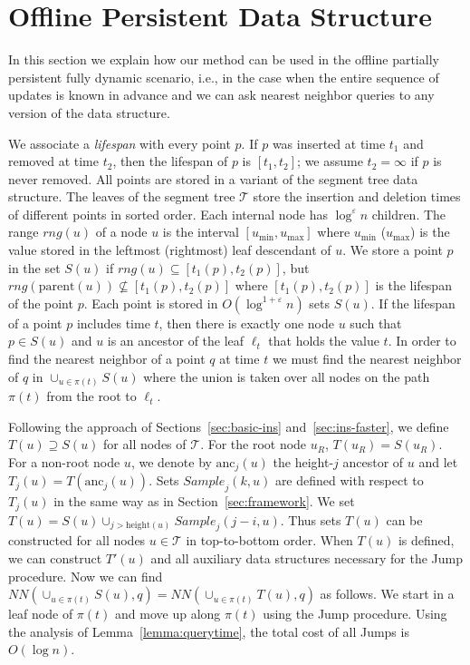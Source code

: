 \documentclass[10pt,a4paper]{amsart}
\newcommand{\Sample}{\mathit{Sample}}
\newcommand{\NN}{\mathit{NN}}
\newcommand{\mcT}{\mathcal{T}}
\newcommand{\eps}{\varepsilon}
\begin{document}
\section{Offline Persistent Data Structure}
\label{sec:persist}
In this section we explain how our method can be used in the offline partially persistent fully dynamic scenario, i.e., in the case when the entire sequence of updates is known in advance and we can ask nearest neighbor queries to any version of the data structure.

We associate a \emph{lifespan} with every point $p$. If $p$ was inserted at time $t_1$ and removed at time $t_2$, then the lifespan of $p$ is $[t_1,t_2]$; we assume $t_2=\infty$ if $p$ is never removed.  All points are stored in a variant of the segment tree data structure. The leaves of the segment tree $\mcT$ store the insertion and deletion times of different points in sorted order. Each internal node has $\log^{\eps} n$ children. The range $rng(u)$ of a node $u$ is the interval $[u_{\min},u_{\max}]$ where $u_{\min}$ ($u_{\max}$) is the value stored in the leftmost (rightmost) leaf descendant of $u$.  We store a point $p$ in the set $S(u)$ if $rng(u)\subseteq [t_{1}(p),t_{2}(p)]$, but $rng(\text{parent}(u))\not\subseteq [t_{1}(p),t_{2}(p)]$ where $[t_{1}(p),t_{2}(p)]$ is the lifespan of the point $p$. Each point is stored in $O(\log^{1+\eps} n)$ sets $S(u)$. If the lifespan of a point $p$ includes time $t$, then there is exactly one node $u$ such that $p\in S(u)$ and $u$ is an ancestor of the leaf $\ell_t$ that holds the value $t$.  In order to find the nearest neighbor of a point $q$ at time $t$ we must find the nearest neighbor of $q$ in $\cup_{u\in \pi(t)}S(u)$ where the union is taken over all nodes on the path $\pi(t)$ from the root to $\ell_t$.  

Following the approach of Sections~\ref{sec:basic-ins} and~\ref{sec:ins-faster}, we define $T(u)\supseteq S(u)$ for all nodes of $\mcT$. For the root node $u_R$, $T(u_R)=S(u_R)$. For a non-root node $u$, we denote by $\text{anc}_j(u)$ the height-$j$ ancestor of $u$ and let  $T_j(u)=T(\text{anc}_j(u))$. Sets $\Sample_j(k,u)$ are defined with respect to $T_j(u)$ in the same way as in Section~\ref{sec:framework}. We set $T(u)=S(u)\cup_{j>\text{height}(u)} \Sample_j(j-i,u)$. Thus sets $T(u)$ can be constructed for all nodes $u\in \mcT$ in top-to-bottom order. When $T(u)$ is defined, we can construct $T'(u)$ and all auxiliary data structures necessary for the Jump procedure. Now we can find $\NN(\cup _{u\in \pi(t)}S(u),q)=\NN(\cup _{u\in \pi(t)}T(u),q)$ as follows. We start in a leaf node of $\pi(t)$ and move up along $\pi(t)$ using the Jump procedure.  Using the analysis of Lemma~\ref{lemma:querytime}, the total cost of all Jumps is $O(\log n)$.
\end{document}
